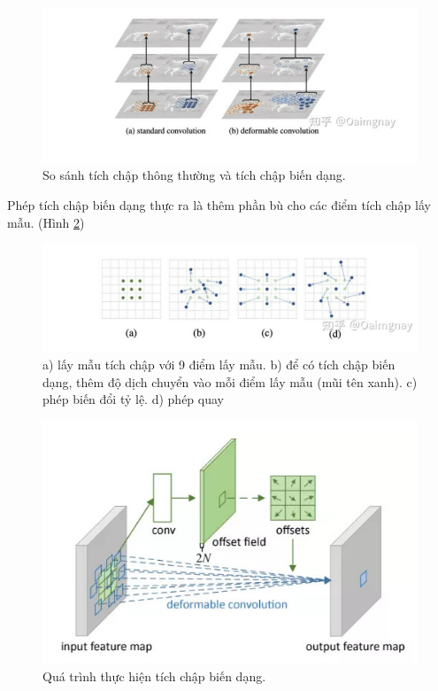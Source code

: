 \documentclass[12pt,a4paper,openany,oneside]{report}
\begin{document}
\begin{figure}[ht!]
	\begin{center}
		\includegraphics[width=445px]{./compare_normal_with_deformable_convolution.jpg}
		\caption{So sánh tích chập thông thường và tích chập biến dạng.}
		\label{so_sanh_tich_chap_thong_thuong_deformable}
	\end{center}
\end{figure} 

Phép tích chập biến dạng thực ra là thêm phần bù cho các điểm tích chập lấy mẫu. (Hình \ref{offset_deformable_convolution})

\begin{figure}[ht!]
	\begin{center}
		\includegraphics[width=445px]{./feature_offset_type.jpg}
		\caption{a) lấy mẫu tích chập với 9 điểm lấy mẫu. b) để có tích chập biến dạng, thêm độ dịch chuyển vào mỗi điểm lấy mẫu (mũi tên xanh). c) phép biến đổi tỷ lệ. d) phép quay
		}
		\label{offset_deformable_convolution}
	\end{center}
\end{figure} 

\begin{figure}[ht!]
	\begin{center}
		\includegraphics[width=500px]{./deformable_process.jpg}
		\caption{Quá trình thực hiện tích chập biến dạng.}
		\label{deformable_process}
	\end{center}
\end{figure} 
\end{document}
